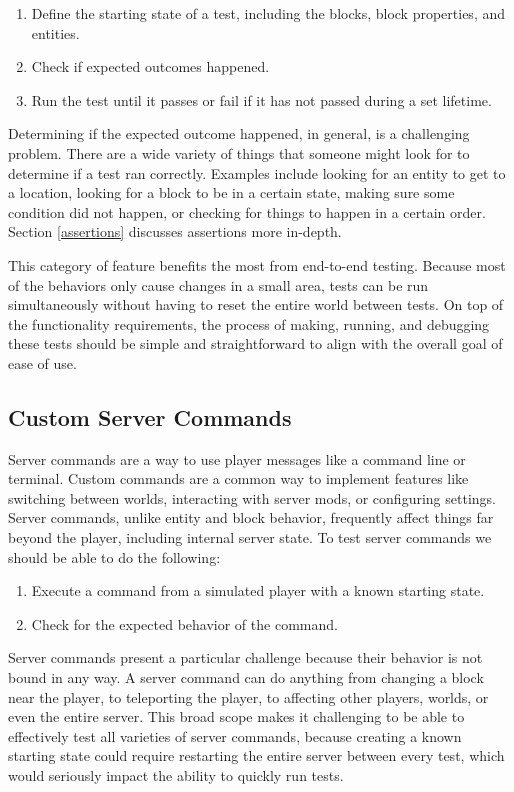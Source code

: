 \documentclass[12pt]{article}
\begin{document}
\begin{onehalfspacing}
\begin{enumerate}
\item
  Define the starting state of a test, including the blocks, block
  properties, and entities.
\item
  Check if expected outcomes happened.
\item
  Run the test until it passes or fail if it has not passed during a set
  lifetime.
\end{enumerate}

Determining if the expected outcome happened, in general, is a
challenging problem. There are a wide variety of things that someone
might look for to determine if a test ran correctly. Examples include
looking for an entity to get to a location, looking for a block to be in
a certain state, making sure some condition did not happen, or checking
for things to happen in a certain order. Section \ref{assertions} discusses
assertions more in-depth.

This category of feature benefits the most from end-to-end testing.
Because most of the behaviors only cause changes in a small area, tests
can be run simultaneously without having to reset the entire world
between tests. On top of the functionality requirements, the process of
making, running, and debugging these tests should be simple and
straightforward to align with the overall goal of ease of use.

\subsection{Custom Server Commands}

Server commands are a way to use player messages like a command line or
terminal. Custom commands are a common way to implement features like
switching between worlds, interacting with server mods, or configuring
settings. Server commands, unlike entity and block behavior, frequently
affect things far beyond the player, including internal server state. To
test server commands we should be able to do the following:

\begin{enumerate}
\item
  Execute a command from a simulated player with a known starting state.
\item
  Check for the expected behavior of the command.
\end{enumerate}

Server commands present a particular challenge because their behavior is
not bound in any way. A server command can do anything from changing a
block near the player, to teleporting the player, to affecting other
players, worlds, or even the entire server. This broad scope makes it
challenging to be able to effectively test all varieties of server
commands, because creating a known starting state could require
restarting the entire server between every test, which would seriously
impact the ability to quickly run tests.


\end{onehalfspacing}
\end{document}
